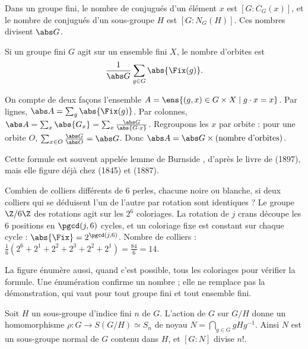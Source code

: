 \begin{corollaire}\label{cor-nb-conjugues}
Dans un groupe fini, le nombre de conjugués d'un élément $x$ est $[G:C_G(x)]$, et le nombre de conjugués d'un sous-groupe $H$ est $[G:N_G(H)]$. Ces nombres divisent $\abs G$.
\end{corollaire}
\begin{theoreme}\label{thm-burnside}
Si un groupe fini $G$ agit sur un ensemble fini $X$, le nombre d'orbites est
\[\frac1{\abs G}\sum_{g\in G}\abs{\Fix(g)}.\]
\end{theoreme}
\begin{preuve}
On compte de deux façons l'ensemble $A=\ens{(g,x)\in G\times X\mid g\cdot x=x}$. Par lignes, $\abs A=\sum_g\abs{\Fix(g)}$. Par colonnes, $\abs A=\sum_x\abs{G_x}=\sum_x\frac{\abs G}{\abs{G\cdot x}}$. Regroupons les $x$ par orbite : pour une orbite $O$, $\sum_{x\in O}\frac{\abs G}{\abs O}=\abs G$. Donc $\abs A=\abs G\times(\text{nombre d'orbites})$.
\end{preuve}
\begin{histoire}
Cette formule est souvent appelée \og lemme de Burnside \fg{}, d'après le livre de  (1897), mais elle figure déjà chez  (1845) et  (1887).
\end{histoire}
\begin{exemple}[Colliers]
Combien de colliers différents de 6 perles, chacune noire ou blanche, si deux colliers qui se déduisent l'un de l'autre par rotation sont identiques ? Le groupe $\Z/6\Z$ des rotations agit sur les $2^6$ coloriages. La rotation de $j$ crans découpe les 6 positions en $\pgcd(j,6)$ cycles, et un coloriage fixe est constant sur chaque cycle : $\abs{\Fix}=2^{\pgcd(j,6)}$. Nombre de colliers : $\frac16(2^6+2^1+2^2+2^3+2^2+2^1)=\frac{84}6=14$.
\end{exemple}
\begin{remarque}
La figure énumère aussi, quand c'est possible, tous les coloriages pour vérifier la formule. Une énumération confirme un nombre ; elle ne remplace pas la démonstration, qui vaut pour tout groupe fini et tout ensemble fini.
\end{remarque}
\begin{proposition}\label{prop-action-classes}
Soit $H$ un sous-groupe d'indice fini $n$ de $G$. L'action de $G$ sur $G/H$ donne un homomorphisme $\rho:G\to S(G/H)\simeq S_n$ de noyau $N=\bigcap_{g\in G}gHg^{-1}$. Ainsi $N$ est un sous-groupe normal de $G$ contenu dans $H$, et $[G:N]$ divise $n!$.
\end{proposition}
